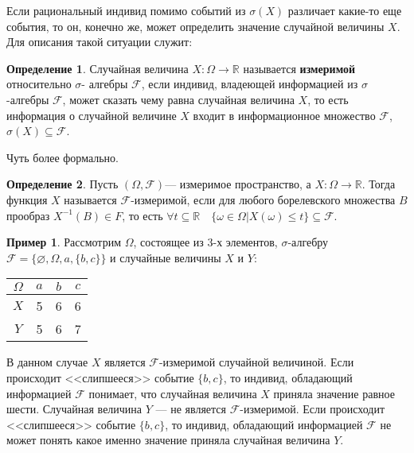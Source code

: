 \documentclass[pdftex, 12pt, a4paper]{article}
\def\R{\ensuremath{\mathbb{R}}} %
\def\F{\ensuremath{\mathcal{F}}} %
\def\s{\ensuremath{\sigma}}
\def \Om{\Omega}
\renewcommand{\to}{\rightarrow}
\renewcommand{\le}{\leqslant}
\theoremstyle{definition} %
\newtheorem*{mydef}{Определение}
\newtheorem{myex}{Пример}
\numberwithin{problem}{section}
\newcommand{\indef}[1]{\textbf{#1}}
\numberwithin{blits}{section}
\begin{document}
Если рациональный индивид помимо событий из $ \sigma(X) $ различает какие-то еще события, то он, конечно же, может определить значение случайной величины $ X $. Для описания такой ситуации служит:

\begin{mydef} Случайная величина $X:\Omega\rightarrow\R$ называется \indef{измеримой} относительно $ \sigma $- алгебры $\F$, если индивид, владеющей информацией из \s-алгебры $\F$, может сказать чему равна случайная величина $X$, то есть информация о случайной величине $X$ входит в информационное множество $\F$, $ \sigma(X)\subseteq \mathcal{F} $. 


\end{mydef}

Чуть более формально.

\begin{mydef}
Пусть $(\Om,\F)$--- измеримое пространство, а $X \colon \Om \to \R$. Тогда функция $X$ называется \F-измеримой, если для любого борелевского множества $B$ прообраз $X^{-1}(B) \in F$, то есть $\forall t \subseteq \R \quad \{\omega \in \Om | X(\omega) \le t\} \subseteq \F$. 
\end{mydef}

\begin{myex}\label{myex:3} Рассмотрим $\Omega$, состоящее из 3-х элементов, $\sigma$-алгебру $\F=\{\varnothing,\Omega,a,\{b,c\}\}$ и случайные величины $X$ и $Y$:

\begin{table}[H]
\begin{center}
\begin{tabular}{|c|c|c|c|}
\hline
$\Om$ & $a$ & $b$ & $c$ \\
\hline
$X$ & 5 & 6 & 6 \\
\hline
$Y$ & 5 & 6 & 7 \\
\hline
\end{tabular}
\end{center}
\end{table}

В данном случае $X$ является $\F$-измеримой случайной величиной. Если происходит <<слипшееся>> событие $\{b,c\}$, то индивид, обладающий информацией \F{} понимает, что случайная величина $X$ приняла значение равное шести. Случайная величина $Y$ --- не является $\F$-измеримой. Если происходит <<слипшееся>> событие $\{b,c\}$, то индивид, обладающий информацией \F{} не может понять какое именно значение приняла случайная величина $Y$. 
\end{myex}
\end{document}
